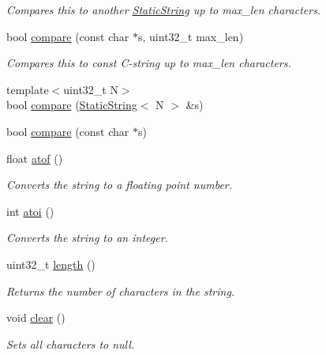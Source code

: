 \begin{DoxyCompactItemize}
\begin{DoxyCompactList}\small\item\em Compares this to another \hyperlink{classetk_1_1_static_string}{Static\-String} up to max\-\_\-len characters. \end{DoxyCompactList}\item 
bool \hyperlink{classetk_1_1_static_string_a660c00de50b340316ca9f91b7b95103a}{compare} (const char $\ast$s, uint32\-\_\-t max\-\_\-len)
\begin{DoxyCompactList}\small\item\em Compares this to const C-\/string up to max\-\_\-len characters. \end{DoxyCompactList}\item 
{\footnotesize template$<$uint32\-\_\-t N$>$ }\\bool \hyperlink{classetk_1_1_static_string_ae67693e7f2226f2bbbfdd3841c56abe5}{compare} (\hyperlink{classetk_1_1_static_string}{Static\-String}$<$ N $>$ \&s)
\item 
bool \hyperlink{classetk_1_1_static_string_a0ed58658bfa5e77ca4609fa213d6fc0d}{compare} (const char $\ast$s)
\item 
float \hyperlink{classetk_1_1_static_string_a97a8dd70c2cc5a59a38315a36e315cb9}{atof} ()
\begin{DoxyCompactList}\small\item\em Converts the string to a floating point number. \end{DoxyCompactList}\item 
int \hyperlink{classetk_1_1_static_string_a3104728d8f19ece98d28d014f8f786d4}{atoi} ()
\begin{DoxyCompactList}\small\item\em Converts the string to an integer. \end{DoxyCompactList}\item 
uint32\-\_\-t \hyperlink{classetk_1_1_static_string_a35ecab4b0438711fa106689f0bc5929b}{length} ()
\begin{DoxyCompactList}\small\item\em Returns the number of characters in the string. \end{DoxyCompactList}\item 
void \hyperlink{classetk_1_1_static_string_a5ddc4131a3eb881f56860cd563d1e537}{clear} ()
\begin{DoxyCompactList}\small\item\em Sets all characters to null. \end{DoxyCompactList}\item 

\end{DoxyCompactItemize}
